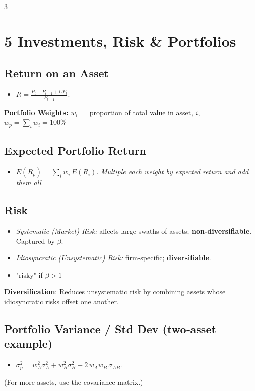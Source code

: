 \documentclass[10pt,landscape,fleqn]{article}
\begin{document}
\begin{multicols}{3}
\section*{5 Investments, Risk \& Portfolios}

\subsection*{Return on an Asset}
\begin{itemize}
  \item $R = \frac{P_t - P_{t-1} + CF_t}{P_{t-1}}.$
\end{itemize}
\textbf{Portfolio Weights:} $w_i =$ proportion of total value in asset, $i$, $w_p = \sum_i w_i = 100\%$

\subsection*{Expected Portfolio Return}
\begin{itemize}
  \item $E(R_p) = \sum_i w_i\,E(R_i).$ \textit{Multiple each weight by expected return and add them all}
\end{itemize}

\subsection*{Risk}
\begin{itemize}
  \item \emph{Systematic (Market) Risk:} affects large swaths of assets; \textbf{non‐diversifiable}. Captured by $\beta$.  
  \item \emph{Idiosyncratic (Unsystematic) Risk:} firm‐specific; \textbf{diversifiable}.
  \item "risky" if $\beta > 1$
\end{itemize}
\textbf{Diversification}: Reduces unsystematic risk by combining assets whose idiosyncratic risks offset one another.

\subsection*{Portfolio Variance / Std Dev (two‐asset example)}
\begin{itemize}
  \item $\sigma_p^2 = w_A^2\sigma_A^2 + w_B^2\sigma_B^2 + 2\,w_Aw_B\,\sigma_{AB}.$
\end{itemize}
(For more assets, use the covariance matrix.)


\end{multicols}
\end{document}
